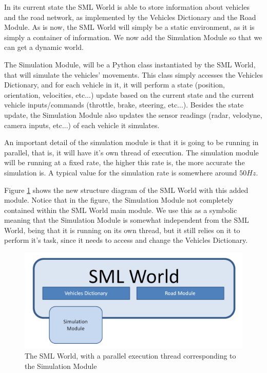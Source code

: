 In its current state the SML World is able to store information about vehicles and the road network, as implemented by the Vehicles Dictionary and the Road Module. As is now, the SML World will simply be a static environment, as it is simply a container of information. We now add the Simulation Module so that we can get a dynamic world.

The Simulation Module, will be a Python class instantiated by the SML World, that will simulate the vehicles' movements. This class simply accesses the Vehicles Dictionary, and for each vehicle in it, it will perform a state (position, orientation, velocities, etc...) update based on the current state and the current vehicle inputs/commands (throttle, brake, steering, etc...). Besides the state update, the Simulation Module also updates the sensor readings (radar, velodyne, camera inputs, etc...) of each vehicle it simulates.

An important detail of the simulation module is that it is going to be running in parallel, that is, it will have it's own thread of execution. The simulation module will be running at a fixed rate, the higher this rate is, the more accurate the simulation is. A typical value for the simulation rate is somewhere around $50 Hz$.

Figure \ref{fig:sml_world_structure_3} shows the new structure diagram of the SML World with this added module. Notice that in the figure, the Simulation Module not completely contained within the SML World main module. We use this as a symbolic meaning that the Simulation Module is somewhat independent from the SML World, being that it is running on its own thread, but it still relies on it to perform it's task, since it needs to access and change the Vehicles Dictionary.

\begin{figure}[h!]
  \centering
    \includegraphics[width=1.0\textwidth]{sml_world_structure_3}
    \caption{The SML World, with a parallel execution thread corresponding to the Simulation Module \label{fig:sml_world_structure_3} }
\end{figure}


